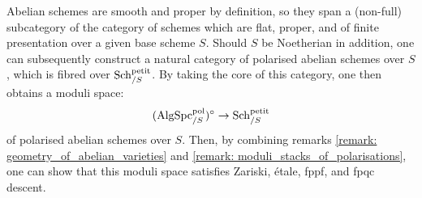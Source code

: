                     \begin{remark} \label{remark: moduli_stacks_of_polarisations_on_abelian_schemes}
                        Abelian schemes are smooth and proper by definition, so they span a (non-full) subcategory of the category of schemes which are flat, proper, and of finite presentation over a given base scheme $S$. Should $S$ be Noetherian in addition, one can subsequently construct a natural category of polarised abelian schemes over $S$, which is fibred over $\mathrm{Sch}_{/S}^{\mathrm{petit}}$. By taking the core of this category, one then obtains a moduli space:
                            $$(\mathrm{Alg}\mathrm{Spc}_{/S}^{\mathrm{pol}})^{\circ} \to \mathrm{Sch}_{/S}^{\mathrm{petit}}$$
                        of polarised abelian schemes over $S$. Then, by combining remarks \ref{remark: geometry_of_abelian_varieties} and \ref{remark: moduli_stacks_of_polarisations}, one can show that this moduli space satisfies Zariski, \'etale, fppf, and fpqc descent.
                    \end{remark}
                    
